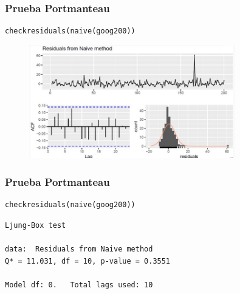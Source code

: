 \documentclass[10pt]{beamer}
\begin{document}




\begin{frame}[fragile]
\frametitle{Prueba Portmanteau}



\begin{lstlisting}
checkresiduals(naive(goog200))
\end{lstlisting}

\pause

\begin{figure}
\begin{center}
    \includegraphics[width=0.8\textwidth]{Imagen16.JPG}
\end{center}
\end{figure}

\end{frame}






\begin{frame}[fragile]
\frametitle{Prueba Portmanteau}



\begin{lstlisting}
checkresiduals(naive(goog200))
\end{lstlisting}



\begin{verbatim}
Ljung-Box test

data:  Residuals from Naive method
Q* = 11.031, df = 10, p-value = 0.3551

Model df: 0.   Total lags used: 10
\end{verbatim}

\end{frame}


\end{document}
